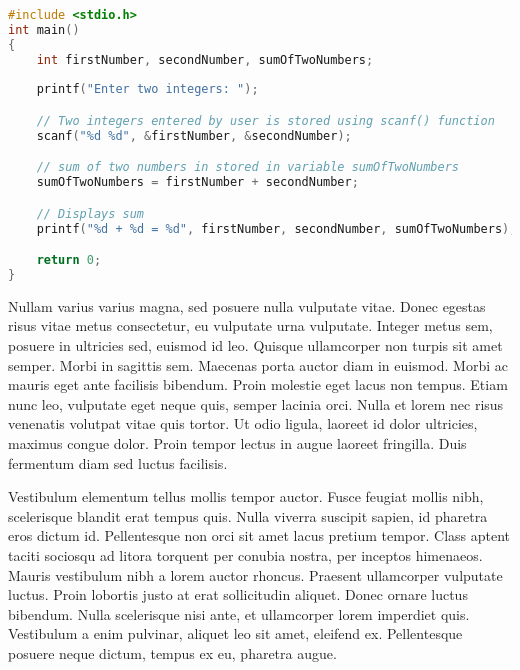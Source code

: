 \begin{lstlisting}[language=C,style=no-color-line,commentstyle=\color{mygreen}, caption=Ejercio de prueba \cite{web:vimgolf}]
#include <stdio.h>
int main()
{
    int firstNumber, secondNumber, sumOfTwoNumbers;
    
    printf("Enter two integers: ");

    // Two integers entered by user is stored using scanf() function
    scanf("%d %d", &firstNumber, &secondNumber);

    // sum of two numbers in stored in variable sumOfTwoNumbers
    sumOfTwoNumbers = firstNumber + secondNumber;

    // Displays sum       
    printf("%d + %d = %d", firstNumber, secondNumber, sumOfTwoNumbers);

    return 0;
}
\end{lstlisting}

Nullam varius varius magna, sed posuere nulla vulputate vitae. Donec egestas risus vitae metus consectetur, eu vulputate urna vulputate. Integer metus sem, posuere in ultricies sed, euismod id leo. Quisque ullamcorper non turpis sit amet semper. Morbi in sagittis sem. Maecenas porta auctor diam in euismod. Morbi ac mauris eget ante facilisis bibendum. Proin molestie eget lacus non tempus. Etiam nunc leo, vulputate eget neque quis, semper lacinia orci. Nulla et lorem nec risus venenatis volutpat vitae quis tortor. Ut odio ligula, laoreet id dolor ultricies, maximus congue dolor. Proin tempor lectus in augue laoreet fringilla. Duis fermentum diam sed luctus facilisis.


Vestibulum elementum tellus mollis tempor auctor. Fusce feugiat mollis nibh, scelerisque blandit erat tempus quis. Nulla viverra suscipit sapien, id pharetra eros dictum id. Pellentesque non orci sit amet lacus pretium tempor. Class aptent taciti sociosqu ad litora torquent per conubia nostra, per inceptos himenaeos. Mauris vestibulum nibh a lorem auctor rhoncus. Praesent ullamcorper vulputate luctus. Proin lobortis justo at erat sollicitudin aliquet. Donec ornare luctus bibendum. Nulla scelerisque nisi ante, et ullamcorper lorem imperdiet quis. Vestibulum a enim pulvinar, aliquet leo sit amet, eleifend ex. Pellentesque posuere neque dictum, tempus ex eu, pharetra augue.

